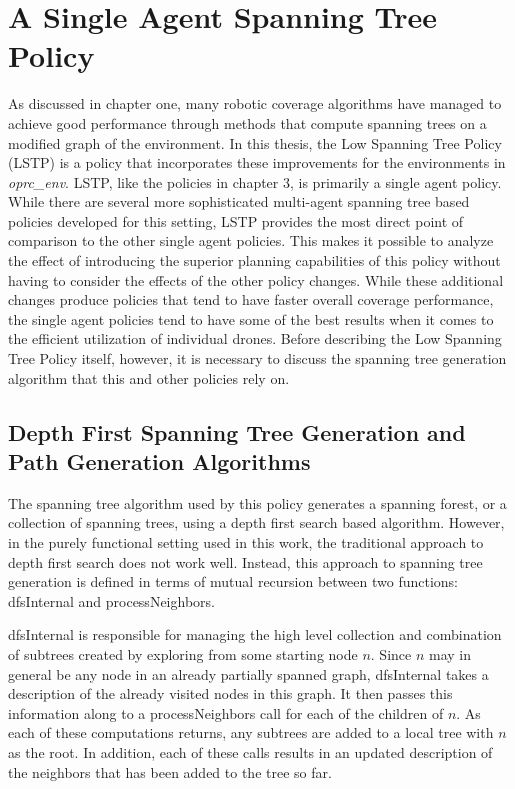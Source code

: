 \section{A Single Agent Spanning Tree Policy}

As discussed in chapter one, many robotic coverage algorithms have managed to achieve good performance through methods that compute spanning trees on a modified graph of the environment. In this thesis, the Low Spanning Tree Policy (LSTP) is a policy that incorporates these improvements for the environments in \textit{oprc\_env}. LSTP, like the policies in chapter 3, is primarily a single agent policy. While there are several more sophisticated multi-agent spanning tree based policies developed for this setting, LSTP provides the most direct point of comparison to the other single agent policies. This makes it possible to analyze the effect of introducing the superior planning capabilities of this policy without having to consider the effects of the other policy changes. While these additional changes produce policies that tend to have faster overall coverage performance, the single agent policies tend to have some of the best results when it comes to the efficient utilization of individual drones. Before describing the Low Spanning Tree Policy itself, however, it is necessary to discuss the spanning tree generation algorithm that this and other policies rely on.

\subsection{Depth First Spanning Tree Generation and Path Generation Algorithms}

The spanning tree algorithm used by this policy generates a spanning forest, or a collection of spanning trees, using a depth first search based algorithm. However, in the purely functional setting used in this work, the traditional approach to depth first search does not work well. Instead, this approach to spanning tree generation is defined in terms of mutual recursion between two functions: dfsInternal and processNeighbors.

dfsInternal is responsible for managing the high level collection and combination of subtrees created by exploring from some starting node $n$. Since $n$ may in general be any node in an already partially spanned graph, dfsInternal takes a description of the already visited nodes in this graph. It then passes this information along to a processNeighbors call for each of the children of $n$. As each of these computations returns, any subtrees are added to a local tree with $n$ as the root. In addition, each of these calls results in an updated description of the neighbors that has been added to the tree so far. 

